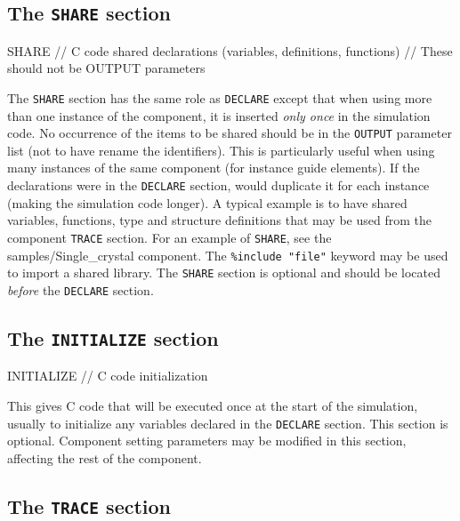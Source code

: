 \subsection{The \texttt{SHARE} section}
\label{s:comp-share}
\begin{mcstas}
SHARE
// C code shared declarations (variables, definitions, functions)
// These should not be OUTPUT parameters
\end{mcstas}


The \texttt{SHARE} section has the same role as \texttt{DECLARE} except that
when using more than one instance of the component, it is inserted \emph{only
  once} in the simulation code. No occurrence of the items to be shared should be
in the \texttt{OUTPUT} parameter list (not to have \MCS rename the
identifiers).  This is particularly useful when using many instances of the same
component (for instance guide elements). If the declarations were in the
\texttt{DECLARE} section, \MCS would duplicate it for each instance (making the
simulation code longer).  A typical example is to have shared variables,
functions, type and structure definitions that may be used from the component
\texttt{TRACE} section. For an example of \texttt{SHARE}, see the
samples/Single\_crystal component. The \verb+%include "file"+ keyword may be
used to import
a shared library. The \texttt{SHARE} section is optional and should be located \textit{before} the \texttt{DECLARE} section.

\subsection{The \texttt{INITIALIZE} section}
\label{s:comp-initialize}

\begin{mcstas}
INITIALIZE
// C code initialization 
\end{mcstas}
 This gives C code that will be executed once at the
start of the simulation, usually to initialize any variables declared in the
\texttt{DECLARE} section. This section is optional. Component setting parameters
may be modified in this section, affecting the rest of the component.


\subsection{The \texttt{TRACE} section}
\label{s:comp-trace}

